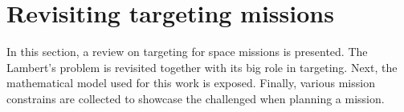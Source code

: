 \chapter{Revisiting targeting missions}

In this section, a review on targeting for space missions is presented. The
Lambert's problem is revisited together with its big role in targeting. Next,
the mathematical model used for this work is exposed. Finally, various mission
constrains are collected to showcase the challenged when planning a mission.





